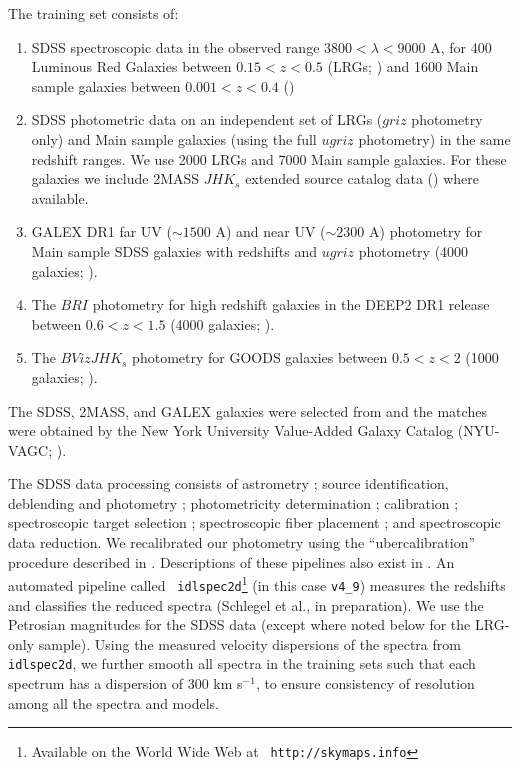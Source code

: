 \documentclass[12pt,preprint]{aastex}
\renewcommand{\AA}{A}
\begin{document}
The training set consists of:
\begin{enumerate}
\item SDSS spectroscopic data in the observed range $3800 < \lambda <
9000$ \AA, for 400 Luminous Red Galaxies between $0.15 < z < 0.5$ (LRGs;
\citealt{eisenstein01a}) and 1600 Main sample galaxies between $0.001
< z < 0.4$ (\citealt{strauss02a})
\item SDSS photometric data on an independent set of LRGs ($griz$
photometry only) and Main sample galaxies (using the full $ugriz$
photometry) in the same redshift ranges. We use 2000 LRGs and 7000
Main sample galaxies.  For these galaxies we include 2MASS $JHK_s$
extended source catalog data (\citealt{jarrett00a}) where available.
\item GALEX DR1 far UV ($\sim 1500$ \AA) and near UV ($\sim 2300$ \AA)
photometry for Main sample SDSS galaxies with redshifts and $ugriz$
photometry (4000 galaxies; \citealt{martin05a}).
\item The $BRI$ photometry for high redshift galaxies in the DEEP2 
DR1 release between $0.6 < z < 1.5$ (4000
galaxies; \citealt{davis03a, faber03a}).
\item The $BVizJHK_s$ photometry for GOODS galaxies between $0.5 < z < 2$ (1000
galaxies; \citealt{giavalisco04a}).
\end{enumerate}
The SDSS, 2MASS, and GALEX galaxies were selected from and the matches
were obtained by the New York University Value-Added Galaxy Catalog
(NYU-VAGC;
\citealt{blanton05a}).  

The SDSS data processing consists of astrometry \citep{pier03a};
source identification, deblending and photometry \citep{lupton01a};
photometricity determination \citep{hogg01a}; calibration
\citep{fukugita96a,smith02a}; spectroscopic target selection
\citep{eisenstein01a,strauss02a,richards02a}; spectroscopic fiber
placement \citep{blanton03a}; and spectroscopic data reduction.  We
recalibrated our photometry using the ``ubercalibration'' procedure
described in \citet{blanton05a}.  Descriptions of these pipelines also
exist in \citet{stoughton02a}.  An automated pipeline called {\tt
idlspec2d}\footnote{Available on the World Wide Web at {\tt
http://skymaps.info}} (in this case {\tt v4\_9}) measures the
redshifts and classifies the reduced spectra (Schlegel et al., in
preparation). We use the Petrosian magnitudes for the SDSS data
(except where noted below for the LRG-only sample). Using the measured
velocity dispersions of the spectra from {\tt idlspec2d}, we further
smooth all spectra in the training sets such that each spectrum has a
dispersion of 300 km s$^{-1}$, to ensure consistency of resolution
among all the spectra and models.
\end{document}
